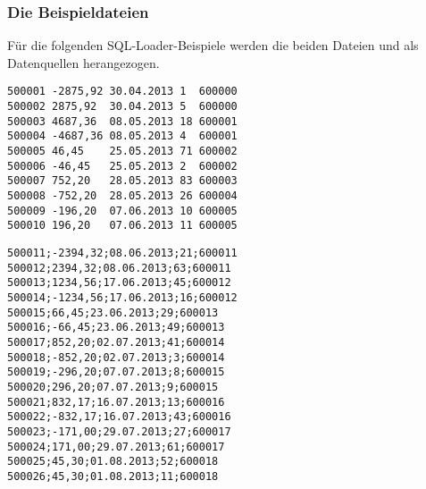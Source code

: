         \subsubsection{Die Beispieldateien}
          Für die folgenden SQL-Loader-Beispiele werden die beiden Dateien  und  als Datenquellen herangezogen.
          \begin{lstlisting}[caption={Die Datei \oscommand{buchungen\_fix.csv}},label=admin920,language=terminal]
500001 -2875,92 30.04.2013 1  600000
500002 2875,92  30.04.2013 5  600000
500003 4687,36  08.05.2013 18 600001
500004 -4687,36 08.05.2013 4  600001
500005 46,45    25.05.2013 71 600002
500006 -46,45   25.05.2013 2  600002
500007 752,20   28.05.2013 83 600003
500008 -752,20  28.05.2013 26 600004
500009 -196,20  07.06.2013 10 600005
500010 196,20   07.06.2013 11 600005
          \end{lstlisting}
          \begin{lstlisting}[caption={Die Datei \oscommand{buchungen\_var.csv}},label=admin920a,language=terminal]
500011;-2394,32;08.06.2013;21;600011
500012;2394,32;08.06.2013;63;600011
500013;1234,56;17.06.2013;45;600012
500014;-1234,56;17.06.2013;16;600012
500015;66,45;23.06.2013;29;600013
500016;-66,45;23.06.2013;49;600013
500017;852,20;02.07.2013;41;600014
500018;-852,20;02.07.2013;3;600014
500019;-296,20;07.07.2013;8;600015
500020;296,20;07.07.2013;9;600015
500021;832,17;16.07.2013;13;600016
500022;-832,17;16.07.2013;43;600016
500023;-171,00;29.07.2013;27;600017
500024;171,00;29.07.2013;61;600017
500025;45,30;01.08.2013;52;600018
500026;45,30;01.08.2013;11;600018
          \end{lstlisting}
